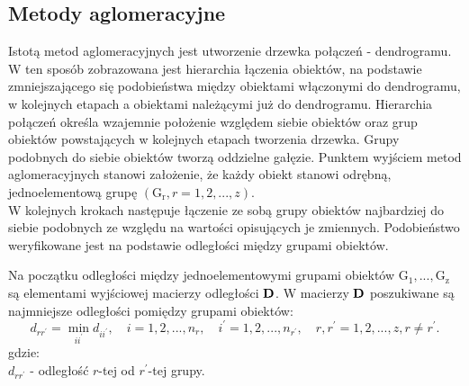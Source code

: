 \documentclass[12pt,a4paper]{report}
\begin{document}
\subsection{Metody aglomeracyjne}
\noindent
Istotą metod aglomeracyjnych jest utworzenie drzewka połączeń - dendrogramu. W ten sposób zobrazowana jest hierarchia łączenia obiektów, na podstawie zmniejszającego się podobieństwa między obiektami włączonymi do dendrogramu, w kolejnych etapach a obiektami należącymi już do dendrogramu. Hierarchia połączeń określa wzajemnie położenie względem siebie obiektów oraz grup obiektów powstających w kolejnych etapach tworzenia drzewka. Grupy podobnych do siebie obiektów tworzą oddzielne gałęzie.  
Punktem wyjściem metod aglomeracyjnych stanowi założenie, że każdy obiekt stanowi odrębną, jednoelementową grupę $(\mathrm{G_{r}}, r=1,2,...,z)$.\\
W kolejnych krokach następuje łączenie ze sobą grupy obiektów najbardziej do siebie podobnych ze względu na wartości opisujących je zmiennych. Podobieństwo weryfikowane jest na podstawie odległości między grupami obiektów. %

Na początku odległości między jednoelementowymi grupami obiektów $\mathrm{G_{1}},...,\mathrm{G_{z}}$ są elementami wyjściowej macierzy odległości $\bold{D}$. W macierzy $\bold{D}$ poszukiwane są najmniejsze odległości pomiędzy grupami obiektów:
\begin{equation}
d_{rr^{'}}= \min\limits_{ii^{'}} {d_{ii^{'}}}, \quad i=1,2,...,n_{r}, \quad i^{'}=1,2,...,n_{r^{'}}, \quad r,r^{'}=1,2,...,z, r\neq r^{'}.
\end{equation}
gdzie:\\
$d_{rr^{'}}$ - odległość $r$-tej od $r^{'}$-tej grupy.
\end{document}
